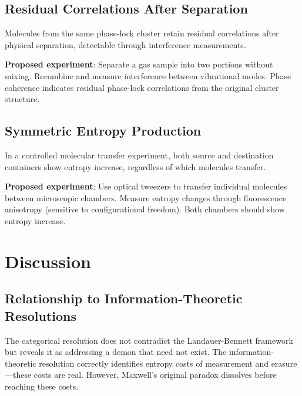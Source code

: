 \subsection{Residual Correlations After Separation}

\begin{prediction}
Molecules from the same phase-lock cluster retain residual correlations after physical separation, detectable through interference measurements.
\end{prediction}

\textbf{Proposed experiment}: Separate a gas sample into two portions without mixing. Recombine and measure interference between vibrational modes. Phase coherence indicates residual phase-lock correlations from the original cluster structure.

\subsection{Symmetric Entropy Production}

\begin{prediction}
In a controlled molecular transfer experiment, both source and destination containers show entropy increase, regardless of which molecules transfer.
\end{prediction}

\textbf{Proposed experiment}: Use optical tweezers to transfer individual molecules between microscopic chambers. Measure entropy changes through fluorescence anisotropy (sensitive to configurational freedom). Both chambers should show entropy increase.

\section{Discussion}
\label{sec:discussion}

\subsection{Relationship to Information-Theoretic Resolutions}

The categorical resolution does not contradict the Landauer-Bennett framework but reveals it as addressing a demon that need not exist. The information-theoretic resolution correctly identifies entropy costs of measurement and erasure---these costs are real. However, Maxwell's original paradox dissolves before reaching these costs.

